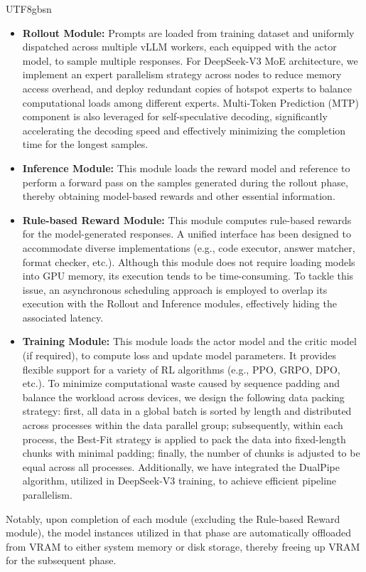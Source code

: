 \documentclass[11pt, a4paper, logo, copyright, nonumbering]{deepseek}
\newcommand{\dsviii}{DeepSeek-V3}
\begin{document}
\begin{CJK*}{UTF8}{gbsn}
\begin{itemize}
    \item \textbf{Rollout Module:} Prompts are loaded from training dataset and uniformly dispatched across multiple vLLM \citep{vllm} workers, each equipped with the actor model, to sample multiple responses. For \dsviii{} MoE architecture, we implement an expert parallelism strategy across nodes to reduce memory access overhead, and deploy redundant copies of hotspot experts to balance computational loads among different experts. Multi-Token Prediction (MTP) component is also leveraged for self-speculative decoding, significantly accelerating the decoding speed and effectively minimizing the completion time for the longest samples.
    \item \textbf{Inference Module:} This module loads the reward model and reference to perform a forward pass on the samples generated during the rollout phase, thereby obtaining model-based rewards and other essential information.
    \item \textbf{Rule-based Reward Module:} This module computes rule-based rewards for the model-generated responses. A unified interface has been designed to accommodate diverse implementations (e.g., code executor, answer matcher, format checker, etc.). Although this module does not require loading models into GPU memory, its execution tends to be time-consuming. To tackle this issue, an asynchronous scheduling approach is employed to overlap its execution with the Rollout and Inference modules, effectively hiding the associated latency.
    \item \textbf{Training Module:} This module loads the actor model and the critic model (if required), to compute loss and update model parameters. It provides flexible support for a variety of RL algorithms (e.g., PPO, GRPO, DPO, etc.). To minimize computational waste caused by sequence padding and balance the workload across devices, we design the following data packing strategy: first, all data in a global batch is sorted by length and distributed across processes within the data parallel group; subsequently, within each process, the Best-Fit strategy is applied to pack the data into fixed-length chunks with minimal padding; finally, the number of chunks is adjusted to be equal across all processes. Additionally, we have integrated the DualPipe algorithm, utilized in \dsviii{} training, to achieve efficient pipeline parallelism.
\end{itemize}

Notably, upon completion of each module (excluding the Rule-based Reward module), the model instances utilized in that phase are automatically offloaded from VRAM to either system memory or disk storage, thereby freeing up VRAM for the subsequent phase.


\end{CJK*}
\end{document}
